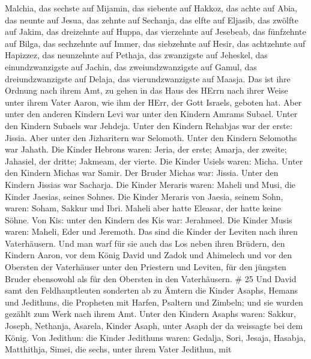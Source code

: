 Malchia, das sechste auf Mijamin,  das siebente auf Hakkoz,
das achte auf Abia,  das neunte auf Jesua, das zehnte auf
Sechanja,  das elfte auf Eljasib, das zwölfte auf Jakim,
 das dreizehnte auf Huppa, das vierzehnte auf Jesebeab,
 das fünfzehnte auf Bilga, das sechzehnte auf Immer,
 das siebzehnte auf Hesir, das achtzehnte auf Hapizzez,
 das neunzehnte auf Pethaja, das zwanzigste auf Jeheskel,
 das einundzwanzigste auf Jachin, das zweiundzwanzigste auf
Gamul,  das dreiundzwanzigste auf Delaja, das
vierundzwanzigste auf Maasja.  Das ist ihre Ordnung nach
ihrem Amt, zu gehen in das Haus des HErrn nach ihrer Weise unter ihrem
Vater Aaron, wie ihm der HErr, der Gott Israels, geboten hat.
 Aber unter den anderen Kindern Levi war unter den Kindern
Amrams Subael. Unter den Kindern Subaels war Jehdeja. 
Unter den Kindern Rehabjas war der erste: Jissia.  Aber
unter den Jizharitern war Selomoth. Unter den Kindern Selomoths war
Jahath.  Die Kinder Hebrons waren: Jeria, der erste;
Amarja, der zweite; Jahasiel, der dritte; Jakmeam, der vierte.
 Die Kinder Usiels waren: Micha. Unter den Kindern Michas
war Samir.  Der Bruder Michas war: Jissia. Unter den
Kindern Jissias war Sacharja.  Die Kinder Meraris waren:
Maheli und Musi, die Kinder Jaesias, seines Sohnes.  Die
Kinder Meraris von Jaesia, seinem Sohn, waren: Soham, Sakkur und Ibri.
 Maheli aber hatte Eleasar, der hatte keine Söhne.
 Von Kis: unter den Kindern des Kis war: Jerahmeel.
 Die Kinder Musis waren: Maheli, Eder und Jeremoth. Das
sind die Kinder der Leviten nach ihren Vaterhäusern.  Und
man warf für sie auch das Los neben ihren Brüdern, den Kindern Aaron,
vor dem König David und Zadok und Ahimelech und vor den Obersten der
Vaterhäuser unter den Priestern und Leviten, für den jüngsten Bruder
ebensowohl als für den Obersten in den Vaterhäusern. \# 25 
Und David samt den Feldhauptleuten sonderten ab zu Ämtern die Kinder
Asaphs, Hemans und Jedithuns, die Propheten mit Harfen, Psaltern und
Zimbeln; und sie wurden gezählt zum Werk nach ihrem Amt. 
Unter den Kindern Asaphs waren: Sakkur, Joseph, Nethanja, Asarela,
Kinder Asaph, unter Asaph der da weissagte bei dem König. 
Von Jedithun: die Kinder Jedithuns waren: Gedalja, Sori, Jesaja,
Hasabja, Matthithja, Simei, die sechs, unter ihrem Vater Jedithun, mit
